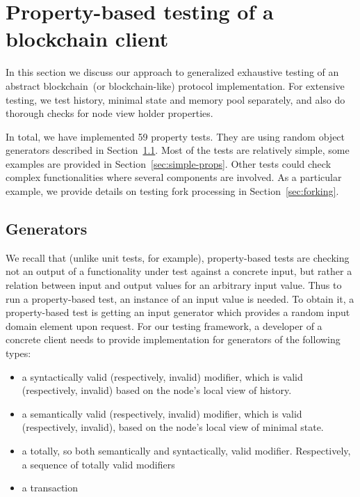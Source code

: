 
\section{Property-based testing of a blockchain client}
\label{sec:props}

In this section we discuss our approach to generalized exhaustive testing of an abstract blockchain~(or blockchain-like) protocol implementation. For extensive testing, we test history, minimal state and memory pool separately, and also do thorough checks for node view holder properties.
	
In total, we have implemented 59 property tests. They are using random object generators described in Section~\ref{sec:generators}. Most of the tests are relatively simple, some examples are provided in Section~\ref{sec:simple-props}. Other tests could check complex functionalities where several components are involved. As a particular example, we provide details on testing fork processing in Section~\ref{sec:forking}.

\subsection{Generators}
\label{sec:generators}

We recall that (unlike unit tests, for example), property-based tests are checking not an output of a functionality under test against a concrete input, but rather a relation between input and output values for an arbitrary input value. Thus to run a property-based test, an instance of an input value is needed. To obtain it, a property-based test is getting an input generator which provides a random input domain element upon request. For our testing framework, a developer of a concrete client needs to provide implementation for generators of the following types:

\begin{itemize}
	\item{a syntactically valid (respectively, invalid) modifier, which is valid (respectively, invalid) based on the node's local view of history.}
	\item{a semantically valid (respectively, invalid) modifier, which is valid (respectively, invalid), based on the node's local view of minimal state.}
	\item{a totally, so both semantically and syntactically, valid modifier. Respectively, a sequence of totally valid modifiers}
	\item{a transaction}
\end{itemize}

